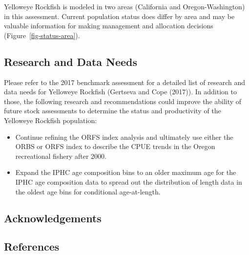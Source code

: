 \documentclass[
]{scrartcl}
\providecommand{\tightlist}{%
  \setlength{\itemsep}{0pt}\setlength{\parskip}{0pt}}\usepackage{longtable,booktabs,array}
\begin{document}
Yelloweye Rockfish is modeled in two areas (California and
Oregon-Washington) in this assessment. Current population status does
differ by area and may be valuable information for making management and
allocation decisions (Figure~\ref{fig-status-area}).

\subsection{Research and Data Needs}\label{research-and-data-needs-1}

Please refer to the 2017 benchmark assessment for a detailed list of
research and data needs for Yelloweye Rockfish (Gertseva and Cope
(2017)). In addition to those, the following research and
recommendations could improve the ability of future stock assessments to
determine the status and productivity of the Yelloweye Rockfish
population:

\begin{itemize}
\tightlist
\item
  Continue refining the ORFS index analysis and ultimately use either
  the ORBS or ORFS index to describe the CPUE trends in the Oregon
  recreational fishery after 2000.
\item
  Expand the IPHC age composition bins to an older maximum age for the
  IPHC age composition data to spread out the distribution of length
  data in the oldest age bins for conditional age-at-length.
\end{itemize}

\newpage{}

\subsection{Acknowledgements}\label{sec-acknowledgements}

\newpage{}

\subsection{References}\label{references}
\end{document}
